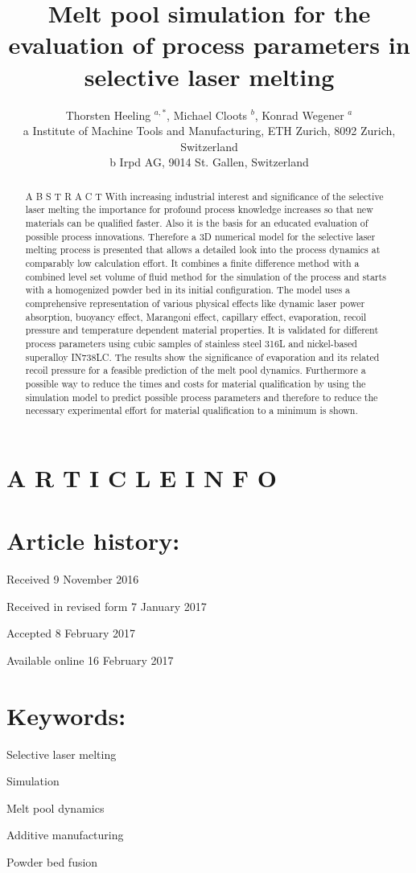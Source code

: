 \documentclass[10pt]{article}
\title{Melt pool simulation for the evaluation of process parameters in selective laser melting }
\author{Thorsten Heeling ${ }^{a, *}$, Michael Cloots ${ }^{b}$, Konrad Wegener ${ }^{a}$\\
a Institute of Machine Tools and Manufacturing, ETH Zurich, 8092 Zurich, Switzerland\\
b Irpd AG, 9014 St. Gallen, Switzerland}
\date{}
\begin{document}
\maketitle


\section*{A R T I C L E I N F O}
\section*{Article history:}
Received 9 November 2016

Received in revised form 7 January 2017

Accepted 8 February 2017

Available online 16 February 2017

\section*{Keywords:}
Selective laser melting

Simulation

Melt pool dynamics

Additive manufacturing

Powder bed fusion

\begin{abstract}
A B S T R A C T With increasing industrial interest and significance of the selective laser melting the importance for profound process knowledge increases so that new materials can be qualified faster. Also it is the basis for an educated evaluation of possible process innovations. Therefore a 3D numerical model for the selective laser melting process is presented that allows a detailed look into the process dynamics at comparably low calculation effort. It combines a finite difference method with a combined level set volume of fluid method for the simulation of the process and starts with a homogenized powder bed in its initial configuration. The model uses a comprehensive representation of various physical effects like dynamic laser power absorption, buoyancy effect, Marangoni effect, capillary effect, evaporation, recoil pressure and temperature dependent material properties. It is validated for different process parameters using cubic samples of stainless steel 316L and nickel-based superalloy IN738LC. The results show the significance of evaporation and its related recoil pressure for a feasible prediction of the melt pool dynamics. Furthermore a possible way to reduce the times and costs for material qualification by using the simulation model to predict possible process parameters and therefore to reduce the necessary experimental effort for material qualification to a minimum is shown.
\end{abstract}
\end{document}
